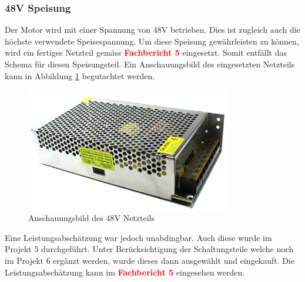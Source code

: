 \subsubsection{48V Speisung}
\label{subsubec:48V Speisung}


Der Motor wird mit einer Spannung von 48V betrieben. Dies ist zugleich auch die höchste verwendete Speisespannung. Um diese Speisung gewährleisten zu können, wird ein fertiges Netzteil gemäss  \textcolor{red}{\textbf{Fachbericht 5}} eingesetzt. Somit entfällt das Schema für diesen Speisungsteil. Ein Anschauungsbild des eingesetzten Netzteils kann in Abbildung \ref{fig:Netzteil_48V} begutachtet werden.\\

\begin{figure}[h!]
	\centering
	\includegraphics[width=0.8\textwidth]{graphics/Netzteil_48V.png}
	\caption{Anschauungsbild des 48V Netzteils}
	\label{fig:Netzteil_48V}
\end{figure} 

Eine Leistungsabschätzung war jedoch unabdingbar. Auch diese wurde im Projekt 5 durchgeführt. Unter Berücksichtigung der Schaltungsteile welche noch im Projekt 6 ergänzt werden, wurde dieses dann ausgewählt und eingekauft. Die Leistungsabschätzung kann im \textcolor{red}{\textbf{Fachbericht 5}} eingesehen werden. 